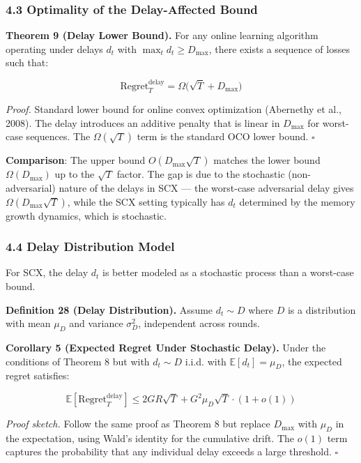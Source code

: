 \documentclass[
  12pt,
]{article}
\begin{document}
\subsubsection{4.3 Optimality of the Delay-Affected
Bound}\label{optimality-of-the-delay-affected-bound}

\textbf{Theorem 9 (Delay Lower Bound).} For any online learning
algorithm operating under delays \(d_t\) with
\(\max_t d_t \geq D_{\max}\), there exists a sequence of losses such
that:

\[\text{Regret}_T^{\text{delay}} = \Omega\bigl( \sqrt{T} + D_{\max} \bigr)\]

\emph{Proof.} Standard lower bound for online convex optimization
(Abernethy et al., 2008). The delay introduces an additive penalty that
is linear in \(D_{\max}\) for worst-case sequences. The
\(\Omega(\sqrt{T})\) term is the standard OCO lower bound. \(\square\)

\textbf{Comparison}: The upper bound \(O(D_{\max}\sqrt{T})\) matches the
lower bound \(\Omega(D_{\max})\) up to the \(\sqrt{T}\) factor. The gap
is due to the stochastic (non-adversarial) nature of the delays in SCX
--- the worst-case adversarial delay gives
\(\Omega(D_{\max} \sqrt{T})\), while the SCX setting typically has
\(d_t\) determined by the memory growth dynamics, which is stochastic.

\subsubsection{4.4 Delay Distribution
Model}\label{delay-distribution-model}

For SCX, the delay \(d_t\) is better modeled as a stochastic process
than a worst-case bound.

\textbf{Definition 28 (Delay Distribution).} Assume \(d_t \sim D\) where
\(D\) is a distribution with mean \(\mu_D\) and variance \(\sigma_D^2\),
independent across rounds.

\textbf{Corollary 5 (Expected Regret Under Stochastic Delay).} Under the
conditions of Theorem 8 but with \(d_t \sim D\) i.i.d. with
\(\mathbb{E}[d_t] = \mu_D\), the expected regret satisfies:

\[\mathbb{E}[\text{Regret}_T^{\text{delay}}] \leq 2GR\sqrt{T} + G^2 \mu_D \sqrt{T} \cdot (1 + o(1))\]

\emph{Proof sketch.} Follow the same proof as Theorem 8 but replace
\(D_{\max}\) with \(\mu_D\) in the expectation, using Wald's identity
for the cumulative drift. The \(o(1)\) term captures the probability
that any individual delay exceeds a large threshold. \(\square\)
\end{document}
